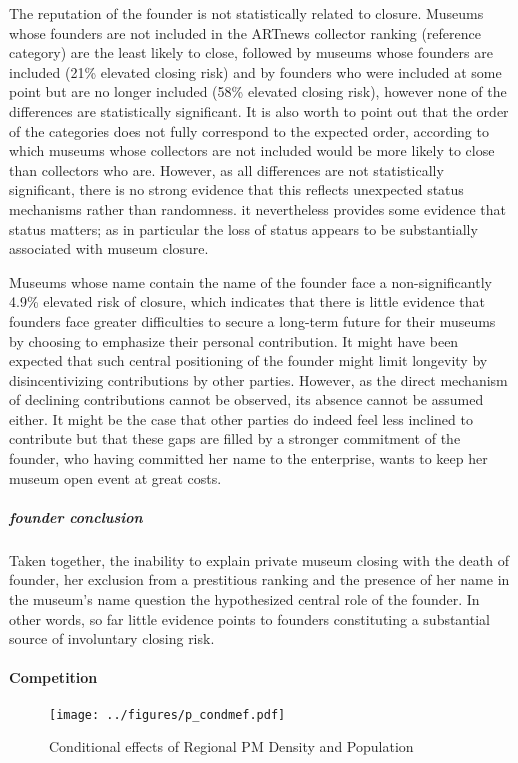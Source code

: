 \documentclass[12pt]{article}
\begin{document}
The reputation of the founder is not statistically related to closure. 
Museums whose founders are not included in the ARTnews collector ranking (reference category) are the least likely to close, followed by museums whose founders are included (21\% elevated closing risk) and by founders who were included at some point but are no longer included (58\% elevated closing risk), however none of the differences are statistically significant.
It is also worth to point out that the order of the categories does not fully correspond to the expected order, according to which museums whose collectors are not included would be more likely to close than collectors who are.
However, as all differences are not statistically significant, there is no strong evidence that this reflects unexpected status mechanisms rather than randomness.
it nevertheless provides some evidence that status matters; as in particular the loss of status appears to be substantially associated with museum closure.



Museums whose name contain the name of the founder face a non-significantly 4.9\% elevated risk of closure, which indicates that there is little evidence that founders face greater difficulties to secure a long-term future for their museums by choosing to emphasize their personal contribution.
It might have been expected that such central positioning of the founder might limit longevity by disincentivizing contributions by other parties.
However, as the direct mechanism of declining contributions cannot be observed, its absence cannot be assumed either.
It might be the case that other parties do indeed feel less inclined to contribute but that these gaps are filled by a stronger commitment of the founder, who having committed her name to the enterprise, wants to keep her museum open event at great costs.
\subparagraph*{founder conclusion}




Taken together, the inability to explain private museum closing with the death of founder, her exclusion from a prestitious ranking and the presence of her name in the museum's name question the hypothesized central role of the founder.
In other words, so far little evidence points to founders constituting a substantial source of involuntary closing risk.
\paragraph*{Competition}


\begin{figure}[htbp]
\centering
\texttt{[image: ../figures/p\_condmef.pdf]}
\caption{\label{fig:p_condmef}Conditional effects of Regional PM Density and Population}
\end{figure}
\end{document}
